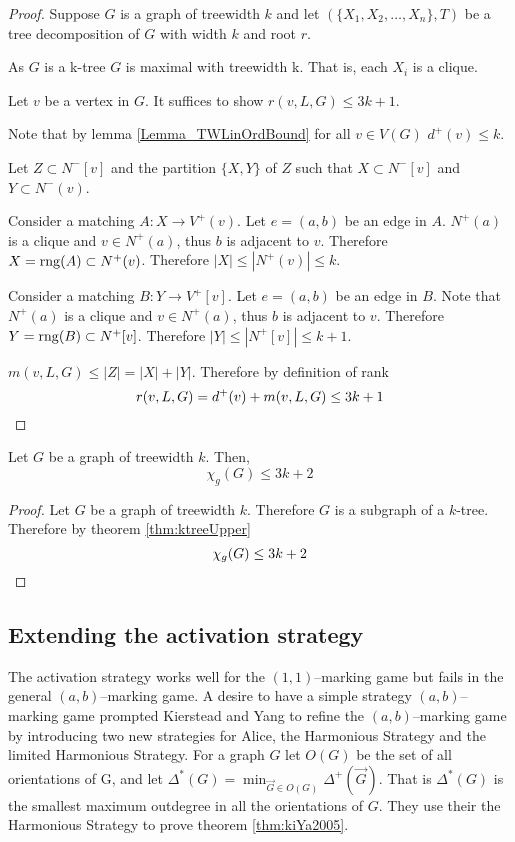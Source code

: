 \begin{proof}
    Suppose $G$ is a graph of treewidth $k$ and let $(\{X_1,X_2,\dots,X_n\},T)$ be a tree decomposition of $G$ with width $k$ and root $r$.
    
    As $G$ is a k-tree $G$ is maximal with treewidth k. That is, each $X_i$ is a clique.
    
    Let $v$ be a vertex in $G$. It suffices to show $r(v,L,G) \leq 3k + 1$.
    
    
    Note that by lemma \ref{Lemma_TWLinOrdBound} for all $v \in V(G)$ $d^+(v) \leq k$.
    
    Let $Z \subset N^-[v]$ and the partition $\{X,Y\}$ of $Z$ such that $X\subset N^-[v]$ and  $Y\subset N^-(v)$.
           
    Consider a matching $A\colon X \to V^+(v)$. Let $e=(a,b)$ be an edge in $A$.
    $N^+(a)$ is a clique and $v\in N^+(a)$, thus $b$ is adjacent to $v$. Therefore $X =\operatorname{rng}(A)\subset N^+(v)$. Therefore $|X| \leq |N^+(v)| \leq k$. 
    
    Consider a matching $B\colon Y \to V^+[v]$. Let $e=(a,b)$ be an edge in $B$.
    Note that $N^+(a)$ is a clique and $v\in N^+(a)$, thus $b$ is adjacent to $v$. Therefore $Y =\operatorname{rng}(B)\subset N^+[v]$. Therefore $|Y| \leq |N^+[v]| \leq k+1$. 
        
    $m(v,L,G) \leq |Z| = |X|+|Y|$. Therefore by definition of rank \[r(v,L,G) = d^+(v) + m(v,L,G) \leq 3k +1 \qedhere\]        
\end{proof}

\begin{corollary}
    Let $G$ be a graph of treewidth $k$. Then, 
    \[\chi_g(G) \leq 3k + 2\]
\end{corollary}

\begin{proof}
    Let $G$ be a graph of treewidth $k$.
    Therefore $G$ is a subgraph of a $k$-tree. Therefore by theorem \ref{thm:ktreeUpper} \[\chi_g(G) \leq 3k + 2 \qedhere\] 
\end{proof}

\subsection{Extending the activation strategy}

The activation strategy works well for the $(1,1)$--marking game but fails in the general $(a,b)$--marking game. A desire to have a simple strategy $(a,b)$--marking game prompted Kierstead and Yang to refine the $(a,b)$--marking game by introducing two new strategies for Alice, the Harmonious Strategy and the limited Harmonious Strategy.  For a graph $G$ let $O(G)$ be the set of all orientations of G, and let $\Delta^*(G)=\min_{\vec{G}\in O(G)}\Delta^+(\vec{G})$. That is $\Delta^*(G)$ is the smallest maximum outdegree in all the orientations of $G$. They use their the Harmonious Strategy to prove theorem \ref{thm:kiYa2005}.

